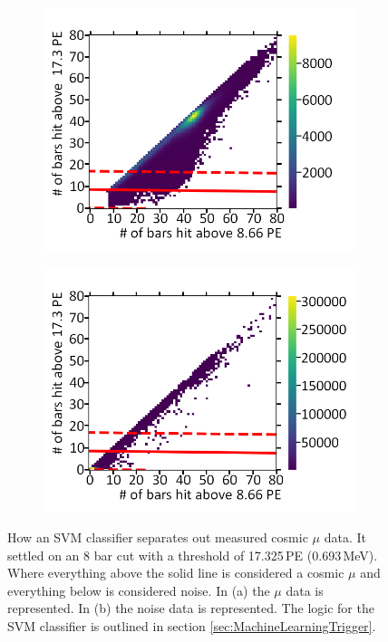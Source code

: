 \begin{figure}[!h]
\centering
\begin{subfigure}{.5\textwidth}
  \centering
  \includegraphics[width=\linewidth]{Chapter6/Figs/Raster/Cosmic8BarSignalCutSvmMedText.png}
  \captionsetup{width=.9\linewidth}
  \caption{}
  \label{subFig:cosmic8BarSignalCutSVM}
\end{subfigure}%
\begin{subfigure}{.5\textwidth}
  \centering
\includegraphics[width=\linewidth]{Chapter6/Figs/Raster/Cosmic8BarNoiseCutSvmMedText.png}
  \captionsetup{width=.9\linewidth}
  \caption{}
  \label{subFig:cosmic8BarNoiseCutSVM}
\end{subfigure}
\caption{How an SVM classifier separates out measured cosmic $\mu$ data. It settled on an 8 bar cut with a threshold of 17.325\,PE (0.693\,MeV). Where everything above the solid line is considered a cosmic $\mu$ and everything below is considered noise. In (a) the $\mu$ data is represented. In (b) the noise data is represented. The logic for the SVM classifier is outlined in section \ref{sec:MachineLearningTrigger}.}
\label{fig:cosmic8BarSignalNoiseCutSVM}
\end{figure}

